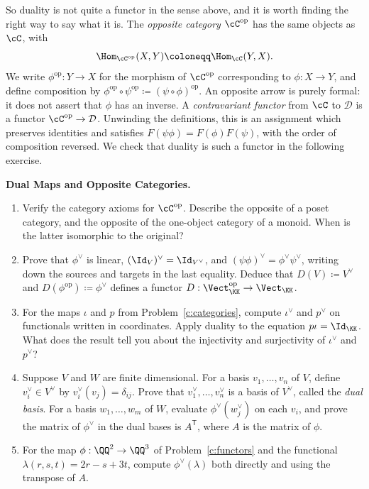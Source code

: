 \documentclass[12pt,reqno]{amsart}
\begin{document}
So duality is not quite a functor in the sense above, and it is worth finding the right way to say what it is. The \emph{opposite category} $\cC^{\mathrm{op}}$ has the same objects as $\cC$, with
\[
\Hom_{\cC^{\mathrm{op}}}(X,Y)\coloneqq\Hom_{\cC}(Y,X).
\]
We write $\phi^{\mathrm{op}}:Y\to X$ for the morphism of $\cC^{\mathrm{op}}$ corresponding to $\phi:X\to Y$, and define composition by $\phi^{\mathrm{op}}\circ\psi^{\mathrm{op}}\coloneqq(\psi\circ\phi)^{\mathrm{op}}$. An opposite arrow is purely formal: it does not assert that $\phi$ has an inverse. A \emph{contravariant functor} from $\cC$ to $\mathcal D$ is a functor $\cC^{\mathrm{op}}\to\mathcal D$. Unwinding the definitions, this is an assignment which preserves identities and satisfies $F(\psi\phi)=F(\phi)F(\psi)$, with the order of composition reversed. We check that duality is such a functor in the following exercise.

\hrulefill

\begin{problems}
\item\label{c:dual} \textbf{Dual Maps and Opposite Categories.}
\begin{enumerate}
\item Verify the category axioms for $\cC^{\mathrm{op}}$. Describe the opposite of a poset category, and the opposite of the one-object category of a monoid. When is the latter isomorphic to the original?
\item Prove that $\phi^{\vee}$ is linear, $(\Id_V)^{\vee}=\Id_{V^{\vee}}$, and $(\psi\phi)^{\vee}=\phi^{\vee}\psi^{\vee}$, writing down the sources and targets in the last equality. Deduce that $D(V)\coloneqq V^{\vee}$ and $D(\phi^{\mathrm{op}})\coloneqq\phi^{\vee}$ defines a functor $D:\Vect_{\KK}^{\mathrm{op}}\to\Vect_{\KK}$.
\item For the maps $\iota$ and $p$ from Problem~\ref{c:categories}, compute $\iota^{\vee}$ and $p^{\vee}$ on functionals written in coordinates. Apply duality to the equation $p\iota=\Id_{\KK}$. What does the result tell you about the injectivity and surjectivity of $\iota^{\vee}$ and $p^{\vee}$?
\item Suppose $V$ and $W$ are finite dimensional. For a basis $v_1,\ldots,v_n$ of $V$, define $v_i^{\vee}\in V^{\vee}$ by $v_i^{\vee}(v_j)=\delta_{ij}$. Prove that $v_1^{\vee},\ldots,v_n^{\vee}$ is a basis of $V^{\vee}$, called the \emph{dual basis}. For a basis $w_1,\ldots,w_m$ of $W$, evaluate $\phi^{\vee}(w_j^{\vee})$ on each $v_i$, and prove the matrix of $\phi^{\vee}$ in the dual bases is $A^{\mathsf T}$, where $A$ is the matrix of $\phi$.
\item For the map $\phi:\QQ^2\to\QQ^3$ of Problem~\ref{c:functors} and the functional $\lambda(r,s,t)=2r-s+3t$, compute $\phi^{\vee}(\lambda)$ both directly and using the transpose of $A$.
\end{enumerate}
\end{problems}
\end{document}
